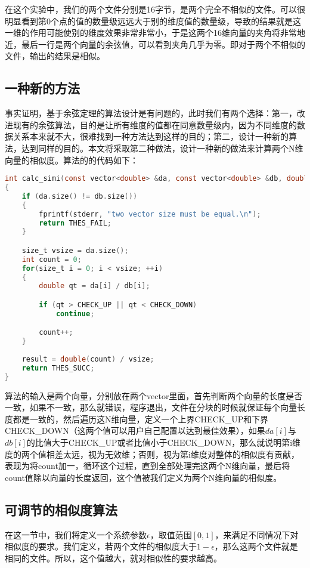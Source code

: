 在这个实验中，我们的两个文件分别是16字节，是两个完全不相似的文件。可以很明显看到第0个点的值的数量级远远大于别的维度值的数量级，导致的结果就是这一维的作用可能使别的维度效果非常非常小，于是这两个16维向量的夹角将非常地近，最后一行是两个向量的余弦值，可以看到夹角几乎为零。即对于两个不相似的文件，输出的结果是相似。

\subsection{一种新的方法}

事实证明，基于余弦定理的算法设计是有问题的，此时我们有两个选择：第一，改进现有的余弦算法，目的是让所有维度的值都在同意数量级内，因为不同维度的数据关系本来就不大，很难找到一种方法达到这样的目的；第二，设计一种新的算法，达到同样的目的。本文将采取第二种做法，设计一种新的做法来计算两个N维向量的相似度。算法的的代码如下：

\begin{lstlisting}[language={C}, caption={检测两个N维向量的相似度}]
int calc_simi(const vector<double> &da, const vector<double> &db, double &result)
{
    if (da.size() != db.size())
    {
        fprintf(stderr, "two vector size must be equal.\n");
        return THES_FAIL;
    }

    size_t vsize = da.size();
    int count = 0;
    for(size_t i = 0; i < vsize; ++i)
    {
        double qt = da[i] / db[i];

        if (qt > CHECK_UP || qt < CHECK_DOWN)
            continue;

        count++;
    }
    
    result = double(count) / vsize;
    return THES_SUCC;
}
\end{lstlisting}
算法的输入是两个向量，分别放在两个vector里面，首先判断两个向量的长度是否一致，如果不一致，那么就错误，程序退出，文件在分块的时候就保证每个向量长度都是一致的，然后遍历这N维向量，定义一个上界CHECK\_UP和下界CHECK\_DOWN（这两个值可以用户自己配置以达到最佳效果），如果$da[i]$与$db[i]$的比值大于CHECK\_UP或者比值小于CHECK\_DOWN，那么就说明第i维度的两个值相差太远，视为无效维；否则，视为第i维度对整体的相似度有贡献，表现为将count加一，循环这个过程，直到全部处理完这两个N维向量，最后将count值除以向量的长度返回，这个值被我们定义为两个N维向量的相似度。

\subsection{可调节的相似度算法}

在这一节中，我们将定义一个系统参数$\epsilon$，取值范围$[0,1]$，来满足不同情况下对相似度的要求。我们定义，若两个文件的相似度大于$1-\epsilon$，那么这两个文件就是相同的文件。所以，这个值越大，就对相似性的要求越高。

